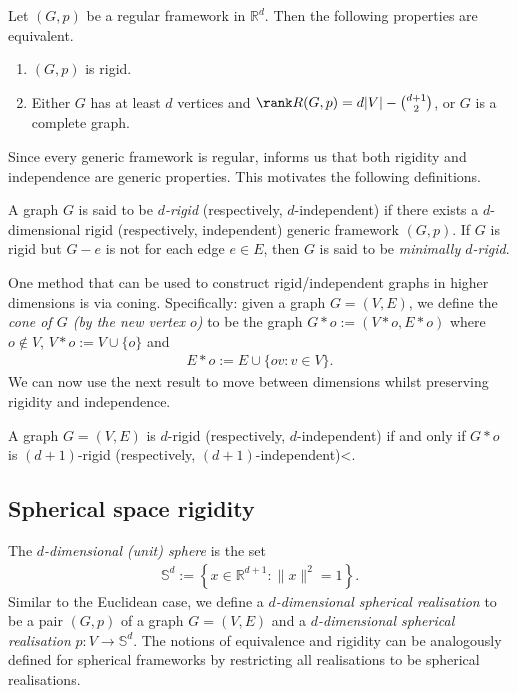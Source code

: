 \begin{theorem}\label{t:asimowroth}
	Let $(G,p)$ be a regular framework in $\mathbb{R}^d$.
	Then the following properties are equivalent.
	\begin{enumerate}
		\item \label{t:asimowroth1} $(G,p)$ is rigid.
		\item \label{t:asimowroth2} Either $G$ has at least $d$ vertices and $\rank R(G,p) = d|V| - \binom{d+1}{2}$, or $G$ is a complete graph.
	\end{enumerate}
\end{theorem}

Since every generic framework is regular,
 informs us that both rigidity and independence are generic properties.
This motivates the following definitions.

\begin{definition}
	A graph $G$ is said to be \emph{$d$-rigid} (respectively, $d$-independent) if there exists a $d$-dimensional rigid (respectively, independent) generic framework $(G,p)$.
	If $G$ is rigid but $G-e$ is not for each edge $e \in E$,
	then $G$ is said to be \emph{minimally $d$-rigid}.
\end{definition}

One method that can be used to construct rigid/independent graphs in higher dimensions is via coning.
Specifically:
given a graph $G=(V,E)$,
we define the \emph{cone of $G$ (by the new vertex $o$)} to be the graph $G*o := (V*o, E*o)$ where $o \notin V$, $V*o := V \cup \{o\}$ and 
\begin{align*}
	E*o := E \cup \{ o v : v \in V\}.
\end{align*}
We can now use the next result to move between dimensions whilst preserving rigidity and independence.

\begin{theorem}\label{t:cone}
	A graph $G=(V,E)$ is $d$-rigid \textup{(}respectively, $d$-independent\textup{)} if and only if $G*o$ is $(d+1)$-rigid \textup{(}respectively, $(d+1)$-independent\textup{)}<.
\end{theorem}
 




\subsection{Spherical space rigidity}

The \emph{$d$-dimensional (unit) sphere} is the set
\begin{align*}
	\mathbb{S}^d := \left\{ x \in \mathbb{R}^{d+1} : \|x\|^2=1 \right\}.
\end{align*}
Similar to the Euclidean case, we define a \emph{$d$-dimensional spherical realisation} to be a pair $(G,p)$ of a graph $G=(V,E)$ and a \emph{$d$-dimensional spherical realisation} \mbox{$p: V \rightarrow \mathbb{S}^d$}.
The notions of equivalence and rigidity can be analogously defined for spherical frameworks by restricting all realisations to be spherical realisations.

